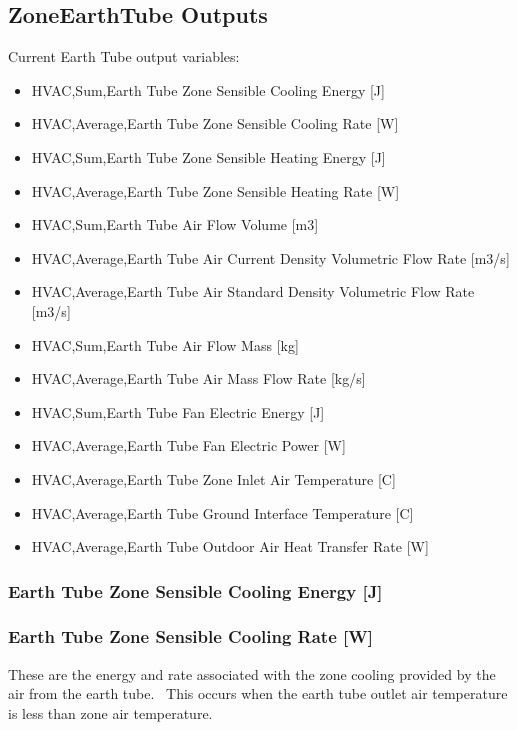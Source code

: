 \subsection{ZoneEarthTube Outputs}\label{zoneearthtube-outputs}

Current Earth Tube output variables:

\begin{itemize}
\item
  HVAC,Sum,Earth Tube Zone Sensible Cooling Energy {[}J{]}
\item
  HVAC,Average,Earth Tube Zone Sensible Cooling Rate {[}W{]}
\item
  HVAC,Sum,Earth Tube Zone Sensible Heating Energy {[}J{]}
\item
  HVAC,Average,Earth Tube Zone Sensible Heating Rate {[}W{]}
\item
  HVAC,Sum,Earth Tube Air Flow Volume {[}m3{]}
\item
  HVAC,Average,Earth Tube Air Current Density Volumetric Flow Rate {[}m3/s{]}
\item
  HVAC,Average,Earth Tube Air Standard Density Volumetric Flow Rate {[}m3/s{]}
\item
  HVAC,Sum,Earth Tube Air Flow Mass {[}kg{]}
\item
  HVAC,Average,Earth Tube Air Mass Flow Rate {[}kg/s{]}
\item
  HVAC,Sum,Earth Tube Fan Electric Energy {[}J{]}
\item
  HVAC,Average,Earth Tube Fan Electric Power {[}W{]}
\item
  HVAC,Average,Earth Tube Zone Inlet Air Temperature {[}C{]}
\item
  HVAC,Average,Earth Tube Ground Interface Temperature {[}C{]}
\item
  HVAC,Average,Earth Tube Outdoor Air Heat Transfer Rate {[}W{]}
\end{itemize}

\subsubsection{Earth Tube Zone Sensible Cooling Energy {[}J{]}}\label{earth-tube-zone-sensible-cooling-energy-j}

\subsubsection{Earth Tube Zone Sensible Cooling Rate {[}W{]}}\label{earth-tube-zone-sensible-cooling-rate-w}

These are the energy and rate associated with the zone cooling provided by the air from the earth tube.~ This occurs when the earth tube outlet air temperature is less than zone air temperature.

